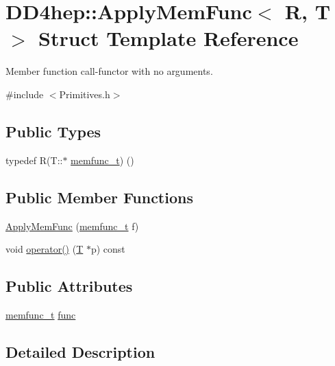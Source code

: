 \hypertarget{struct_d_d4hep_1_1_apply_mem_func}{}\section{D\+D4hep\+:\+:Apply\+Mem\+Func$<$ R, T $>$ Struct Template Reference}
\label{struct_d_d4hep_1_1_apply_mem_func}


Member function call-\/functor with no arguments.  




{\ttfamily \#include $<$Primitives.\+h$>$}

\subsection*{Public Types}
\begin{DoxyCompactItemize}
\item 
typedef R(T\+::$\ast$ \hyperlink{struct_d_d4hep_1_1_apply_mem_func_ab5971c00734a619f31885e8d0fa156f0}{memfunc\+\_\+t}) ()
\end{DoxyCompactItemize}
\subsection*{Public Member Functions}
\begin{DoxyCompactItemize}
\item 
\hyperlink{struct_d_d4hep_1_1_apply_mem_func_a6bf11f21888593fa22e7c4a354b9f965}{Apply\+Mem\+Func} (\hyperlink{struct_d_d4hep_1_1_apply_mem_func_ab5971c00734a619f31885e8d0fa156f0}{memfunc\+\_\+t} f)
\item 
void \hyperlink{struct_d_d4hep_1_1_apply_mem_func_a5c23f7d05bb793df22199f8f037cc780}{operator()} (\hyperlink{class_t}{T} $\ast$p) const
\end{DoxyCompactItemize}
\subsection*{Public Attributes}
\begin{DoxyCompactItemize}
\item 
\hyperlink{struct_d_d4hep_1_1_apply_mem_func_ab5971c00734a619f31885e8d0fa156f0}{memfunc\+\_\+t} \hyperlink{struct_d_d4hep_1_1_apply_mem_func_a9cb93a8dbd712d6daf163e4b46992bf4}{func}
\end{DoxyCompactItemize}


\subsection{Detailed Description}

